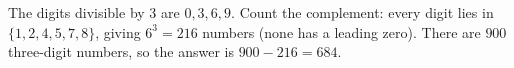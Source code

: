 The digits divisible by $3$ are $0,3,6,9$. Count the complement: every digit lies in $\{1,2,4,5,7,8\}$, giving $6^3=216$ numbers (none has a leading zero). There are $900$ three-digit numbers, so the answer is $900-216=\boxed{684}$.
